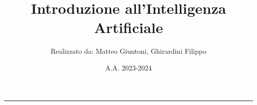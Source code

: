 \documentclass[a4paper,10pt]{article}
\title{\textbf{Introduzione all'Intelligenza Artificiale}}
\author{Realizzato da: Matteo Giuntoni, Ghirardini Filippo}
\date{A.A. 2023-2024}
\theoremstyle{remark}
\theoremstyle{definition}
\theoremstyle{plain}
\theoremstyle{definition}
\theoremstyle{definition}
\theoremstyle{definition}
\theoremstyle{plain}
\theoremstyle{plain}
\begin{document}
	
	
	\tableofcontents
	\newpage
	\maketitle
	\begin{center}
		\vspace{-20pt}
		\rule{11cm}{.1pt} 
	\end{center}
	
	
	
	
\end{document}
